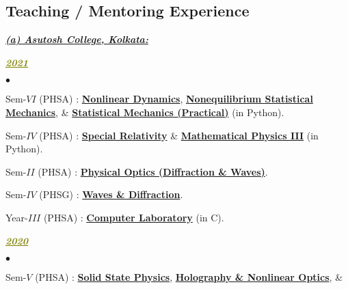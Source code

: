 \documentclass[margin,line]{res}
\newenvironment{list1}{
  \begin{list}{\ding{113}}{%
      \setlength{\itemsep}{0in}
      \setlength{\parsep}{0in} \setlength{\parskip}{0in}
      \setlength{\topsep}{0in} \setlength{\partopsep}{0in} 
      \setlength{\leftmargin}{0.17in}}}{\end{list}}
\newenvironment{list2}{
  \begin{list}{$\bullet$}{%
      \setlength{\itemsep}{0in}
      \setlength{\parsep}{0in} \setlength{\parskip}{0in}
      \setlength{\topsep}{0in} \setlength{\partopsep}{0in} 
      \setlength{\leftmargin}{0.2in}}}{\end{list}}
\begin{document}
\begin{resume}
\section{\sc Teaching / Mentoring Experience}
\begin{list1}
\item[] \textcolor{alizarin}{\underline{\textbf{\textit{(a) Asutosh College, Kolkata:}}}}
\vspace{1mm}
\end{list1}
\begin{list1}
\item[] \textcolor{olive}{\underline{\textbf{\textit{2021}}}}
\vspace{1mm}
\end{list1}
\begin{list2}
\item Sem-$VI$ (PHSA) : \href{https://amitbny.github.io/akb.github.io/sem6H_nld.html}{\bf Nonlinear Dynamics}, 
                       \href{https://amitbny.github.io/akb.github.io/sem6H_neqsm.html}{\bf Nonequilibrium Statistical Mechanics}, \& 
                       \href{https://amitbny.github.io/akb.github.io/sem6H_numerlab.html}{\bf Statistical Mechanics (Practical)} (in Python).
\item Sem-$IV$ (PHSA) : \href{https://amitbny.github.io/akb.github.io/sem4H_SR.html}{\bf Special Relativity} \& 
                        \href{https://amitbny.github.io/akb.github.io/sem4H_numerlab.html}{\bf Mathematical Physics III} (in Python). 
\item Sem-$II$ (PHSA) : \href{https://amitbny.github.io/akb.github.io/sem2H_diffholo.html}{\bf Physical Optics (Diffraction \& Waves)}.
\item Sem-$IV$ (PHSG) : \href{https://amitbny.github.io/akb.github.io/sem4G_diffpolar.html}{\bf Waves \& Diffraction}.
\item Year-$III$ (PHSA) : \href{https://amitbny.github.io/akb.github.io/numerlabVIIIB.html}{\bf Computer Laboratory} (in C). 
\end{list2}
\begin{list1}
\item[] \textcolor{olive}{\underline{\textbf{\textit{2020}}}}
\vspace{1mm}
\end{list1}
\begin{list2}
\item Sem-$V$ (PHSA) : \href{https://amitbny.github.io/akb.github.io/sem5H_SSP.html}{\bf Solid State Physics}, 
                       \href{https://amitbny.github.io/akb.github.io/sem5H_nloptics.html}{\bf Holography \& Nonlinear Optics}, \& 

\end{list2}
\end{resume}
\end{document}
